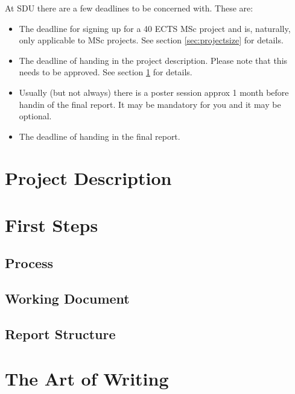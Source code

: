 \documentclass[a4paper]{memoir}
\begin{document}
At SDU there are a few deadlines to be concerned with. These are:
\begin{itemize}
  \item The deadline for signing up for a 40 ECTS MSc project and is, naturally, only applicable to MSc projects. See section \ref{sec:projectsize} for details.
  \item The deadline of handing in the project description. Please note that this needs to be approved. See section \ref{sec:projectdesc} for details.
  \item Usually (but not always) there is a poster session approx 1 month before handin of the final report. It may be mandatory for you and it may be optional.
  \item The deadline of handing in the final report.
\end{itemize}

\chapter{Project Description}
\label{sec:projectdesc}

\chapter{First Steps}

\section{Process}

\section{Working Document}

\section{Report Structure}

\chapter{The Art of Writing}
\end{document}
